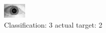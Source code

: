 \begin{figure}[h!]
\begin{center}
\includegraphics[width=0.60\columnwidth]{figures/ID1732_class_3_target_2.png}
\end{center}
\caption{ Classification: 3 actual target: 2}
\label{fig:ID1732_class_3_target_2}
\end{figure}
